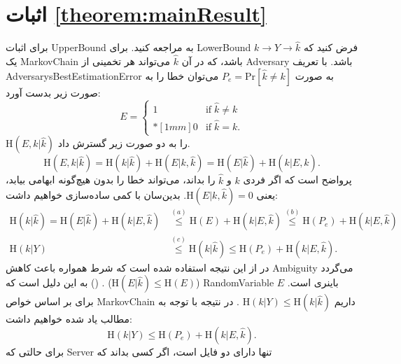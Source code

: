 \section{اثبات \autoref{theorem:mainResult}}
\label{sec:ProofmainResult}
برای اثبات 
\gls{UpperBound} به \cite{Feder1994Relations,Hu2012Analytical}
مراجعه کنید. برای 
\gls{LowerBound}
فرض کنید که 
$k\longrightarrow  Y \longrightarrow \hat{k}$ یک \gls{MarkovChain}
باشد، که در آن 
$\hat{k}$
می‌تواند هر تخمینی از 
\gls{Adversary}
باشد. با تعریف
\gls{AdversarysBestEstimationError} به صورت $P_{e}=\mathrm{Pr}[\hat{k}\neq k]$
می‌توان خطا را به صورت زیر بدست آورد:
\begin{equation}
E=\left\lbrace
\begin{array}{ll}
1 & \mathrm{if}\; \hat{k}\neq k \\*[1mm]
0 & \mathrm{if}\; \hat{k}= k.
\end{array}
\right.
\end{equation}
$\mathrm{H}(E,k|\hat{k})$
را به دو صورت زیر گسترش داد.
\begin{equation}
\mathrm{H}(E,k|\hat{k}) =\mathrm{H}(k|\hat{k})+\mathrm{H}(E|k,\hat{k})
= \mathrm{H}(E|\hat{k})+\mathrm{H}(k|E,\hat{k}).
\label{eq:twoexapnd}
\end{equation}
پرواضح است که اگر فردی
 $k$ و $\hat{k}$
را بداند، می‌تواند خطا را بدون هیچ‌گونه ابهامی بیابد، یعنی 
 $\mathrm{H}(E|k,\hat{k})=0$.
بدین‌سان با کمی ساده‌سازی خواهیم داشت:
 \begin{align}
 \mathrm{H}(k|\hat{k}) = \mathrm{H}(E|\hat{k})+\mathrm{H}(k|E,\hat{k})
& \stackrel{(a)}{\leq}  \mathrm{H}(E) + \mathrm{H}(k|E,\hat{k})
\stackrel{(b)}{\leq}  \mathrm{H}(P_e) + \mathrm{H}(k|E,\hat{k})\nonumber\\
 \mathrm{H}(k|Y) &\stackrel{(c)}{\leq} \mathrm{H}(k|\hat{k}) \leq  \mathrm{H}(P_e) + \mathrm{H}(k|E,\hat{k}).
 \end{align}
در   از این نتیجه استفاده شده است که  شرط همواره باعث کاهش
 \gls{Ambiguity}
 می‌گردد
 ($\mathrm{H}(E|\hat{k})\leq \mathrm{H}(E)$) \cite[بخش $2.2$]{cover2006elements}.
 ()
 به این دلیل است که 
 \gls{RandomVariable} $E$
 باینری است. برای  بر اساس خواص
 \gls{MarkovChain}
 داریم
 $\mathrm{H}(k|Y) \leq \mathrm{H}(k|\hat{k})$ \cite[رابطه $2.121$]{cover2006elements}.
در نتیجه با توجه به مطالب یاد شده خواهیم داشت:
\begin{equation}
\mathrm{H}(k|Y) \leq \mathrm{H}(P_e) + \mathrm{H}(k|E,\hat{k}).
\label{eq:finalfanoes}
\end{equation}
برای حالتی که 
\gls{Server}
تنها دارای دو فایل است، اگر کسی بداند که 
